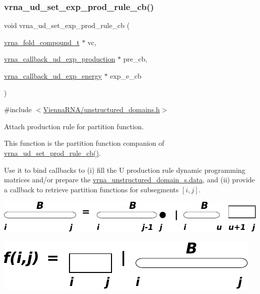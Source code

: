 \subsubsection{\texorpdfstring{vrna\+\_\+ud\+\_\+set\+\_\+exp\+\_\+prod\+\_\+rule\+\_\+cb()}{vrna\_ud\_set\_exp\_prod\_rule\_cb()}}
{\footnotesize\ttfamily void vrna\+\_\+ud\+\_\+set\+\_\+exp\+\_\+prod\+\_\+rule\+\_\+cb (\begin{DoxyParamCaption}\item[{\hyperlink{group__fold__compound_ga1b0cef17fd40466cef5968eaeeff6166}{vrna\+\_\+fold\+\_\+compound\+\_\+t} $\ast$}]{vc,  }\item[{\hyperlink{group__domains__up_ga33d78327dcd04c1ca5ab2887edc18c7b}{vrna\+\_\+callback\+\_\+ud\+\_\+exp\+\_\+production} $\ast$}]{pre\+\_\+cb,  }\item[{\hyperlink{group__domains__up_ga861706f257ba993753464b823e65b86e}{vrna\+\_\+callback\+\_\+ud\+\_\+exp\+\_\+energy} $\ast$}]{exp\+\_\+e\+\_\+cb }\end{DoxyParamCaption})}



{\ttfamily \#include $<$\hyperlink{unstructured__domains_8h}{Vienna\+R\+N\+A/unstructured\+\_\+domains.\+h}$>$}



Attach production rule for partition function. 

This function is the partition function companion of \hyperlink{group__domains__up_ga745a99f0bc72898d54de16f6e538828a}{vrna\+\_\+ud\+\_\+set\+\_\+prod\+\_\+rule\+\_\+cb()}.

Use it to bind callbacks to (i) fill the {\ttfamily U} production rule dynamic programming matrices and/or prepare the \hyperlink{group__domains__up_a8802b1b0512999a9f35202031811ce17}{vrna\+\_\+unstructured\+\_\+domain\+\_\+s.\+data}, and (ii) provide a callback to retrieve partition functions for subsegments $ [i,j] $.

 
\begin{DoxyImageNoCaption}
  \mbox{\includegraphics[width=\textwidth,height=\textheight/2,keepaspectratio=true]{B_prod_rule}}
\end{DoxyImageNoCaption}


 
\begin{DoxyImageNoCaption}
  \mbox{\includegraphics[width=\textwidth,height=\textheight/2,keepaspectratio=true]{ligands_up_callback}}
\end{DoxyImageNoCaption}


